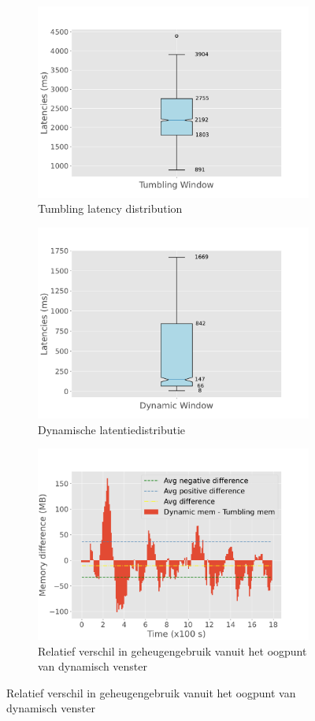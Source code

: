 \begin{figure}
\begin{subfigure}[b]{0.5\columnwidth}
        \includegraphics[width=\columnwidth]{fig/periodic/TumblingWindow_latency_boxplot.pdf}
        \caption{Tumbling latency distribution}
        \label{fig:periodic_tumb_boxplot}
    \end{subfigure}
    \hfill 
    \begin{subfigure}[b]{0.5\columnwidth}
        \includegraphics[width=\columnwidth]{fig/periodic/DynamicWindow_latency_boxplot.pdf}
        \caption{Dynamische latentiedistributie}
        \label{fig:periodic_dynamic_boxplot}
    \end{subfigure}
    \begin{subfigure}[b]{\columnwidth}
        \centering
        \includegraphics[width=0.5\columnwidth]{fig/periodic/mem_difference_bar.pdf}
        \caption{Relatief verschil in geheugengebruik vanuit het oogpunt van dynamisch venster}
        \label{fig:periodic_mem_diff}
    \end{subfigure}


\end{figure}
